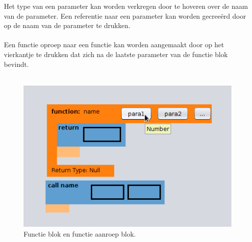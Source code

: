 \documentclass[]{article}
\begin{document}
Het type van een parameter kan worden verkregen door te hoveren over de naam van de parameter. Een referentie naar een parameter kan worden gecree\"{e}rd door op de naam van de parameter te drukken.\\\\
Een functie oproep naar een functie kan worden aangemaakt door op het vierkantje te drukken dat zich na de laatste parameter van de functie blok bevindt.\\\\
\begin{figure}[H]
  \centering
\includegraphics[scale=0.4]{Documentatie/images/functie}
  \caption{Functie blok en functie aanroep blok.} 
\end{figure}
\end{document}
